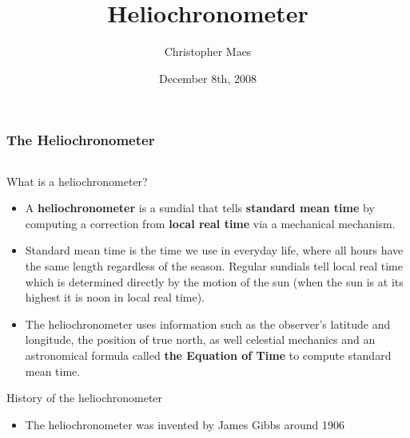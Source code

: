 \documentclass[final]{beamer}
\title{Heliochronometer}
\author{Christopher Maes}
\institute{Mechanical Engineering 203, Stanford University}
\date{December 8th, 2008}
\begin{document}
\begin{frame}
\frametitle{The Heliochronometer} 
\begin{columns}[t]
\begin{column}[t]{0.24 \textwidth}
\alert{What is a heliochronometer?}

\begin{itemize}
\item A {\bf heliochronometer} is a sundial that tells {\bf
standard mean time} by computing a correction from {\bf local real
time} via a mechanical mechanism.

\item 
Standard mean time is the time we use in everyday life, where all
hours have the same length regardless of the season. Regular
sundials tell local real time which is determined directly by
the motion of the sun (when the sun is at its highest it is noon in
local real time).

\item  The heliochronometer uses information such as 
the observer's latitude and longitude, the position of 
true north, as well celestial mechanics and an astronomical
formula called {\bf the Equation of Time} to compute 
standard mean time.
\end{itemize}
    
\alert{History of the heliochronometer}
\begin{itemize}
\item  The heliochronometer was invented by James Gibbs around 1906

\begin{center}
\end{center}


\end{itemize}
\end{column}
\end{columns}
\end{frame}
\end{document}

